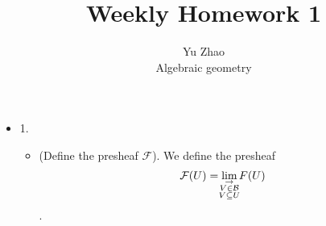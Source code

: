 \documentclass[12pt]{article}
\begin{document}
 
 
\title{Weekly Homework 1}%
\author{Yu Zhao\\ %
Algebraic geometry} %
 
\maketitle
\begin{itemize}
\item 1.
  \begin{itemize}
  \item (Define the presheaf $\mathcal{F}$). We define the presheaf 
    $$\mathcal{F}(U)=\lim_{\mathclap {\substack{\rightarrow \\V \in \mathcal{B} \\ V \subseteq U}}} F(U)$$.


\end{itemize}
\end{itemize}
\end{document}

